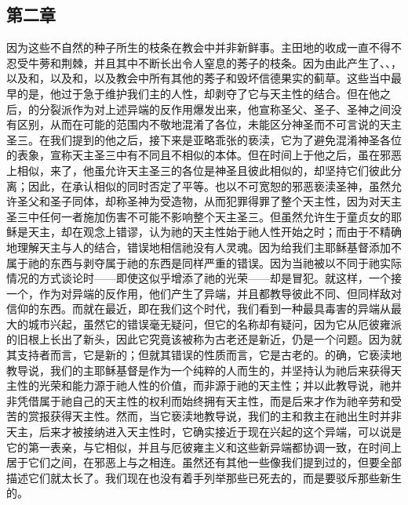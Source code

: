 
\subsection{第二章}

\par

因为这些不自然的种子所生的枝条在教会中并非新鲜事。主田地的收成一直不得不忍受牛蒡和荆棘，并且其中不断长出令人窒息的莠子的枝条。因为由此产生了、、，以及和，以及和，以及教会中所有其他的莠子和毁坏信德果实的蓟草。这些当中最早的是，他过于急于维护我们主的人性，却剥夺了它与天主性的结合。但在他之后，的分裂派作为对上述异端的反作用爆发出来，他宣称圣父、圣子、圣神之间没有区别，从而在可能的范围内不敬地混淆了各位，未能区分神圣而不可言说的天主圣三。在我们提到的他之后，接下来是亚略乖张的亵渎，它为了避免混淆神圣各位的表象，宣称天主圣三中有不同且不相似的本体。但在时间上于他之后，虽在邪恶上相似，来了，他虽允许天主圣三的各位是神圣且彼此相似的，却坚持它们彼此分离；因此，在承认相似的同时否定了平等。也以不可宽恕的邪恶亵渎圣神，虽然允许圣父和圣子同体，却称圣神为受造物，从而犯罪得罪了整个天主性，因为对天主圣三中任何一者施加伤害不可能不影响整个天主圣三。但虽然允许生于童贞女的耶稣是天主，却在观念上错谬，认为祂的天主性始于祂人性开始之时；而由于不精确地理解天主与人的结合，错误地相信祂没有人灵魂。因为给我们主耶稣基督添加不属于祂的东西与剥夺属于祂的东西是同样严重的错误。因为当祂被以不同于祂实际情况的方式谈论时——即使这似乎增添了祂的光荣——却是冒犯。就这样，一个接一个，作为对异端的反作用，他们产生了异端，并且都教导彼此不同、但同样敌对信仰的东西。而就在最近，即在我们这个时代，我们看到一种最具毒害的异端从最大的城市兴起，虽然它的错误毫无疑问，但它的名称却有疑问，因为它从厄彼雍派的旧根上长出了新头，因此它究竟该被称为古老还是新近，仍是一个问题。因为就其支持者而言，它是新的；但就其错误的性质而言，它是古老的。的确，它亵渎地教导说，我们的主耶稣基督是作为一个纯粹的人而生的，并坚持认为祂后来获得天主性的光荣和能力源于祂人性的价值，而非源于祂的天主性；并以此教导说，祂并非凭借属于祂自己的天主性的权利而始终拥有天主性，而是后来才作为祂辛劳和受苦的赏报获得天主性。然而，当它亵渎地教导说，我们的主和救主在祂出生时并非天主，后来才被接纳进入天主性时，它确实接近于现在兴起的这个异端，可以说是它的第一表亲，与它相似，并且与厄彼雍主义和这些新异端都协调一致，在时间上居于它们之间，在邪恶上与之相连。虽然还有其他一些像我们提到过的，但要全部描述它们就太长了。我们现在也没有着手列举那些已死去的，而是要驳斥那些新生的。\par

